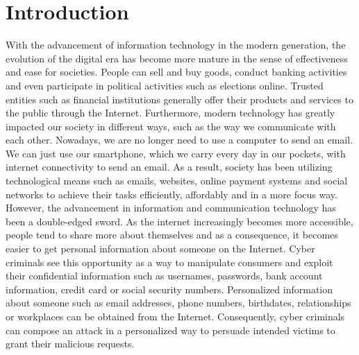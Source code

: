 
\chapter{Introduction}

%
With the advancement of information technology in the modern generation,
the evolution of the digital era has become more mature in the sense
of effectiveness and ease for societies. People can sell and buy goods,
conduct banking activities and even participate in political activities
such as elections online. Trusted entities such as financial institutions
generally offer their products and services to the public through
the Internet. Furthermore, modern technology has greatly impacted
our society in different ways, such as the way we communicate with
each other. Nowadays, we are no longer need to use a computer to send
an email. We can just use our smartphone, which we carry every day
in our pockets, with internet connectivity to send an email. As a
result, society has been utilizing technological means such as emails,
websites, online payment systems and social networks to achieve their
tasks efficiently, affordably and in a more focus way. However, the
advancement in information and communication technology has been a
double-edged sword. As the internet increasingly becomes more accessible,
people tend to share more about themselves and as a consequence, it
becomes easier to get personal information about someone on the Internet.
Cyber criminals see this opportunity as a way to manipulate consumers
and exploit their confidential information such as usernames, passwords,
bank account information, credit card or social security numbers.
Personalized information about someone such as email addresses, phone
numbers, birthdates, relationships or workplaces can be obtained from
the Internet. Consequently, cyber criminals can compose an attack
in a personalized way to persuade intended victims to grant their
malicious requests.

